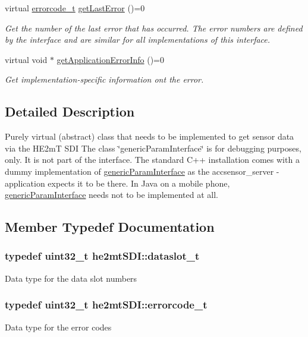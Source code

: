 \begin{DoxyCompactItemize}
virtual \hyperlink{classhe2mt_s_d_i_aa527ccf96fd5eacc154c1c23e56fc9fd}{errorcode\-\_\-t} \hyperlink{classhe2mt_s_d_i_a2f0bf651098d94ab7ffc04f7b3b00fdf}{get\-Last\-Error} ()=0
\begin{DoxyCompactList}\small\item\em Get the number of the last error that has occurred. The error numbers are defined by the interface and are similar for all implementations of this interface. \end{DoxyCompactList}\item 
virtual void $\ast$ \hyperlink{classhe2mt_s_d_i_ab95b4854cfc4841a7f2dae073fa011fe}{get\-Application\-Error\-Info} ()=0
\begin{DoxyCompactList}\small\item\em Get implementation-\/specific information ont the error. \end{DoxyCompactList}\end{DoxyCompactItemize}


\subsection{Detailed Description}
Purely virtual (abstract) class that needs to be implemented to get sensor data via the H\-E2m\-T S\-D\-I The class \char`\"{}generic\-Param\-Interface\char`\"{} is for debugging purposes, only. It is not part of the interface. The standard C++ installation comes with a dummy implementation of \hyperlink{classgeneric_param_interface}{generic\-Param\-Interface} as the accsensor\-\_\-server -\/ application expects it to be there. In Java on a mobile phone, \hyperlink{classgeneric_param_interface}{generic\-Param\-Interface} needs not to be implemented at all. 

\subsection{Member Typedef Documentation}
\hypertarget{classhe2mt_s_d_i_ad0bd9136f18c52d27b93cfca85bf05dd}{
\subsubsection[{dataslot\-\_\-t}]{\setlength{\rightskip}{0pt plus 5cm}typedef uint32\-\_\-t {\bf he2mt\-S\-D\-I\-::dataslot\-\_\-t}}}\label{classhe2mt_s_d_i_ad0bd9136f18c52d27b93cfca85bf05dd}
Data type for the data slot numbers \hypertarget{classhe2mt_s_d_i_aa527ccf96fd5eacc154c1c23e56fc9fd}{
\subsubsection[{errorcode\-\_\-t}]{\setlength{\rightskip}{0pt plus 5cm}typedef uint32\-\_\-t {\bf he2mt\-S\-D\-I\-::errorcode\-\_\-t}}}\label{classhe2mt_s_d_i_aa527ccf96fd5eacc154c1c23e56fc9fd}
Data type for the error codes 

